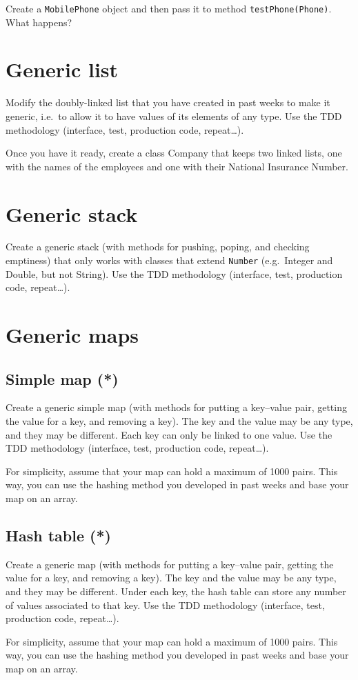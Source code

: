 \documentclass{article}
\begin{document}
Create a \verb+MobilePhone+ object and then pass it to method
\verb+testPhone(Phone)+. What happens?

\section{Generic list}
\label{sec:generic-list}

Modify the doubly-linked list that you have created in past weeks to make it
generic, i.e.~to allow it to have values of its elements of any
type. Use the TDD methodology (interface, test, production code,
repeat\ldots).

Once you have it ready, create a class Company that keeps two linked
lists, one with the names of the employees and one with their National
Insurance Number. 

\section{Generic stack}
\label{sec:generic-stack}

Create a generic stack (with methods for pushing, poping, and checking
emptiness) that only works with classes that extend \verb+Number+
(e.g.~Integer and Double, but not String). Use the TDD methodology
(interface, test, production code, repeat\ldots).

\section{Generic maps}
\label{sec:generic-map}

\subsection{Simple map (*)}
\label{sec:array-based-impl}

Create a generic simple map (with methods for putting a key--value pair,
getting the value for a key, and removing a key). The key and the
value may be any type, and they may be different. Each key can only be
linked to one value. 
Use the TDD methodology
(interface, test, production code, repeat\ldots).

For simplicity, assume that your map can hold a maximum of 1000
pairs. This way, you can use the hashing method you developed in past
weeks and base your map on an array. 

\subsection{Hash table (*)}
\label{sec:array-based-impl}

Create a generic map (with methods for putting a key--value pair,
getting the value for a key, and removing a key). The key and the
value may be any type, and they may be different. Under each key, the
hash table can store any number of values associated to that key. 
Use the TDD methodology
(interface, test, production code, repeat\ldots).

For simplicity, assume that your map can hold a maximum of 1000
pairs. This way, you can use the hashing method you developed in past
weeks and base your map on an array. 
\end{document}
